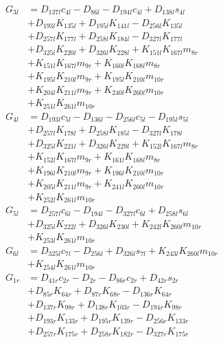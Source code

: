 \begin{multicols}{2}
\begin{align}
G_{3l} &= D_{137l}c_{4l} - D_{86l} - D_{194l}c_{4l} + D_{138l}s_{4l}  \nonumber \\
&+ D_{193l}K_{135l} + D_{195l}K_{141l} - D_{256l}K_{135l}  \nonumber \\
&+ D_{257l}K_{177l} + D_{258l}K_{184l} - D_{327l}K_{177l}  \nonumber \\
&+ D_{325l}K_{220l} + D_{326l}K_{228l} + K_{151l}K_{167l}m_{8r}  \nonumber \\
&+ K_{151l}K_{167l}m_{9r} + K_{160l}K_{168l}m_{8r}  \nonumber \\
&+ K_{195l}K_{210l}m_{9r} + K_{195l}K_{210l}m_{10r}  \nonumber \\
&+ K_{204l}K_{211l}m_{9r} + K_{240l}K_{260l}m_{10r}  \nonumber \\
&+ K_{251l}K_{261l}m_{10r} \nonumber \\
G_{4l} &= D_{193l}c_{5l} - D_{136l} - D_{256l}c_{5l} - D_{195l}s_{5l}  \nonumber \\
&+ D_{257l}K_{178l} + D_{258l}K_{185l} - D_{327l}K_{178l}  \nonumber \\
&+ D_{325l}K_{221l} + D_{326l}K_{229l} + K_{152l}K_{167l}m_{8r}  \nonumber \\
&+ K_{152l}K_{167l}m_{9r} + K_{161l}K_{168l}m_{8r}  \nonumber \\
&+ K_{196l}K_{210l}m_{9r} + K_{196l}K_{210l}m_{10r}  \nonumber \\
&+ K_{205l}K_{211l}m_{9r} + K_{241l}K_{260l}m_{10r}  \nonumber \\
&+ K_{252l}K_{261l}m_{10r} \nonumber \\
G_{5l} &= D_{257l}c_{6l} - D_{194l} - D_{327l}c_{6l} + D_{258l}s_{6l}  \nonumber \\
&+ D_{325l}K_{222l} + D_{326l}K_{230l} + K_{242l}K_{260l}m_{10r}  \nonumber \\
&+ K_{253l}K_{261l}m_{10r} \nonumber \\
G_{6l} &= D_{325l}c_{7l} - D_{256l} + D_{326l}s_{7l} + K_{243l}K_{260l}m_{10r}  \nonumber \\
&+ K_{254l}K_{261l}m_{10r} \nonumber \\
G_{1r} &= D_{41r}c_{2r} - D_{2r} - D_{86r}c_{2r} + D_{42r}s_{2r}  \nonumber \\
&+ D_{85r}K_{64r} + D_{87r}K_{68r} - D_{136r}K_{64r}  \nonumber \\
&+ D_{137r}K_{98r} + D_{138r}K_{103r} - D_{194r}K_{98r}  \nonumber \\
&+ D_{193r}K_{133r} + D_{195r}K_{139r} - D_{256r}K_{133r}  \nonumber \\
&+ D_{257r}K_{175r} + D_{258r}K_{182r} - D_{327r}K_{175r}  \nonumber \\

\end{align}
\end{multicols}
